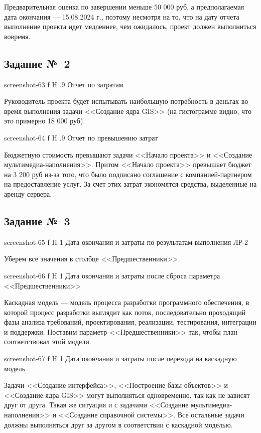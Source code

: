 \documentclass{bmstu}
\begin{document}
Предварительная оценка по завершении меньше 50 000 руб, а предполагаемая дата окончания --- 15.08.2024 г., поэтому несмотря на то, что на дату отчета выполнение проекта идет медленнее, чем ожидалось, проект должен выполниться вовремя.
    
\subsection{Задание №~2}
    
    {screenshot-63}
    {f}
    {H}
    {.9\textwidth}
    {Отчет по затратам}
    
Руководитель проекта будет испытывать наибольшую потребность в деньгах во время выполнения задачи <<Создание ядра GIS>> (на гистограмме видно, что это примерно 18 000 руб).

    {screenshot-64}
    {f}
    {H}
    {.9\textwidth}
    {Отчет по превышению затрат}
    
Бюджетную стоимость превышают задачи <<Начало проекта>> и <<Создание мультимедиа-наполнения>>. 
Притом <<Начало проекта>> превышает бюджет на 3 200 руб из-за того, что было подписано соглашение с компанией-партнером на предоставление услуг. 
За счет этих затрат экономятся средства, выделенные на аренду сервера.

\subsection{Задание №~3}

    {screenshot-65}
    {f}
    {H}
    {1\textwidth}
    {Дата окончания и затраты по результатам выполнения ЛР-2}
    
Уберем все значения в столбце <<Предшественники>>.
    
    {screenshot-66}
    {f}
    {H}
    {1\textwidth}
    {Дата окончания и затраты после сброса параметра <<Предшественники>>}
    
Каскадная модель --- модель процесса разработки программного обеспечения, в которой процесс разработки выглядит как поток, последовательно проходящий фазы анализа требований, проектирования, реализации, тестирования, интеграции и поддержки. 
Поставим параметр <<Предшественники>> так, чтобы план соответствовал этой модели.
    
    {screenshot-67}
    {f}
    {H}
    {1\textwidth}
    {Дата окончания и затраты после перехода на каскадную модель}
    
Задачи <<Создание интерфейса>>, <<Построение базы объектов>> и <<Создание ядра GIS>> могут выполняться одновременно, так как не зависят друг от друга. 
Такая же ситуация и с задачами <<Создание мультимедиа-наполнения>> и <<Создание справочной системы>>. 
Все остальные задачи должны выполняться друг за другом в соответствии с каскадной моделью.
    
\end{document}
